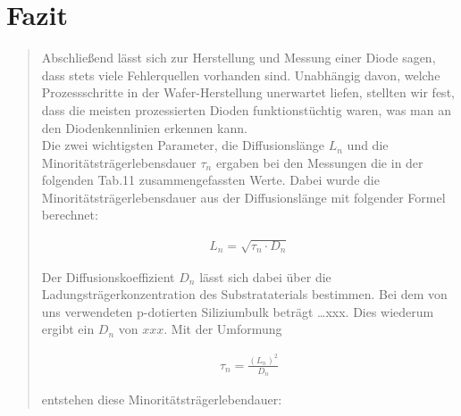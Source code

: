 \begin{quote}
\begin{quote}
        \end{quote}

\end{quote} %


\newpage

\section{Fazit}
\begin{quote}

    Abschließend lässt sich zur Herstellung und Messung einer Diode sagen, dass
    stets viele Fehlerquellen vorhanden sind. Unabhängig davon, welche
    Prozessschritte in der Wafer-Herstellung unerwartet liefen, stellten wir
    fest, dass die meisten prozessierten Dioden funktionstüchtig waren, was man
    an den Diodenkennlinien erkennen kann.\\
    
    Die zwei wichtigsten Parameter, die Diffusionslänge $L_n$ und die
    Minoritätsträgerlebensdauer $\tau_n$ ergaben bei den Messungen die
    in der folgenden Tab.11 zusammengefassten Werte. Dabei wurde die
    Minoritätsträgerlebensdauer aus der Diffusionslänge mit folgender Formel berechnet:
    
    \begin{equation*}
        \begin{split}
            L_{n} = \sqrt{\tau_{n} \cdot D_{n}}
        \end{split}
    \end{equation*}
    
    Der Diffusionskoeffizient $D_n$ lässt sich dabei über die
    Ladungsträgerkonzentration des Substrataterials bestimmen. Bei dem von uns
    verwendeten p-dotierten Siliziumbulk beträgt \ldots xxx. Dies wiederum
    ergibt ein $D_n$ von $xxx$. Mit der Umformung
    
    \begin{equation*}
        \begin{split}
            \tau_n = \frac{(L_n)^2}{D_n}
        \end{split}
    \end{equation*}
    
    entstehen diese Minoritätsträgerlebendauer:
    
    \vspace{1.5em}
    

\end{quote}
